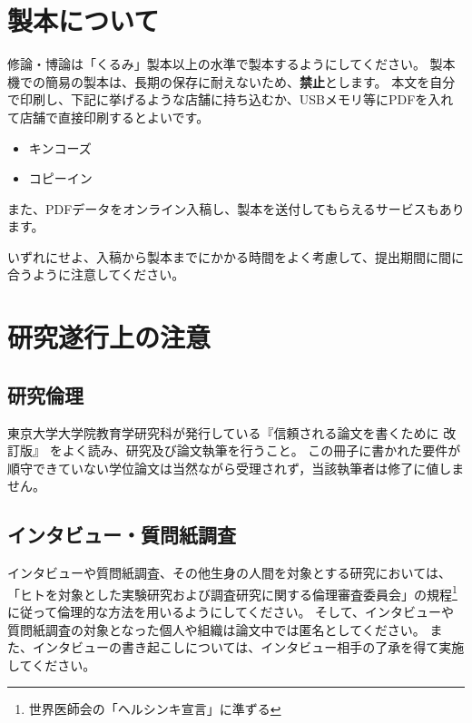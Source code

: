 
\chapter{製本について}
	\label{app:seihon}

	修論・博論は「くるみ」製本以上の水準で製本するようにしてください。
	製本機での簡易の製本は、長期の保存に耐えないため、\textbf{禁止}とします。
	本文を自分で印刷し、下記に挙げるような店舗に持ち込むか、USBメモリ等にPDFを入れて店舗で直接印刷するとよいです。

	\begin{itemize}
		\item キンコーズ
		\item コピーイン
	\end{itemize}

	また、PDFデータをオンライン入稿し、製本を送付してもらえるサービスもあります。

	いずれにせよ、入稿から製本までにかかる時間をよく考慮して、提出期間に間に合うように注意してください。

\chapter{研究遂行上の注意}\label{app:ethic}

	\section{研究倫理}
		\label{sec:echic}

		東京大学大学院教育学研究科が発行している『信頼される論文を書くために 改訂版』
		をよく読み、研究及び論文執筆を行うこと。
		この冊子に書かれた要件が順守できていない学位論文は当然ながら受理されず，当該執筆者は修了に値しません。

	\section{インタビュー・質問紙調査}
		\label{sec:interview}

		インタビューや質問紙調査、その他生身の人間を対象とする研究においては、「ヒトを対象とした実験研究および調査研究に関する倫理審査委員会」の規程\footnote{世界医師会の「ヘルシンキ宣言」に準ずる}に従って倫理的な方法を用いるようにしてください。
		そして、インタビューや質問紙調査の対象となった個人や組織は論文中では匿名としてください。
		また、インタビューの書き起こしについては、インタビュー相手の了承を得て実施してください。

